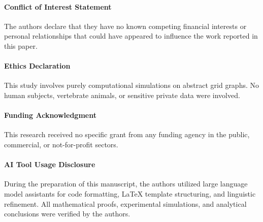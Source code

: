 \documentclass[11pt,a4paper]{article}
\begin{document}
\paragraph{Conflict of Interest Statement}
The authors declare that they have no known competing financial interests or personal relationships that could have appeared to influence the work reported in this paper.

\paragraph{Ethics Declaration}
This study involves purely computational simulations on abstract grid graphs. No human subjects, vertebrate animals, or sensitive private data were involved.

\paragraph{Funding Acknowledgment}
This research received no specific grant from any funding agency in the public, commercial, or not-for-profit sectors.

\paragraph{AI Tool Usage Disclosure}
During the preparation of this manuscript, the authors utilized large language model assistants for code formatting, LaTeX template structuring, and linguistic refinement. All mathematical proofs, experimental simulations, and analytical conclusions were verified by the authors.
\end{document}
